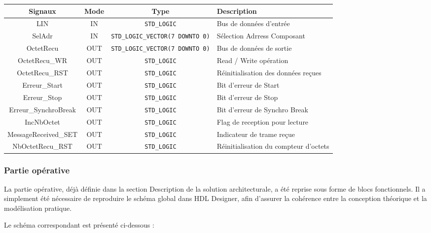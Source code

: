 \begin{center}
\renewcommand{\arraystretch}{1.2} %
\small %
    \begin{tabularx}{\textwidth}{|c||c|c|X|}
     \hline			
       \textbf{Signaux} & \textbf{Mode} & \textbf{Type} & \textbf{Description}  \\ \hline 
       LIN & IN & \texttt{STD\_LOGIC} & Bus de données d'entrée \\
       SelAdr & IN & \texttt{STD\_LOGIC\_VECTOR(7 DOWNTO 0)} & Sélection Adrress Composant \\
       OctetRecu & OUT & \texttt{STD\_LOGIC\_VECTOR(7 DOWNTO 0)} & Bus de données de sortie \\
       OctetRecu\_WR & OUT & \texttt{STD\_LOGIC} & Read / Write opération \\
       OctetRecu\_RST & OUT & \texttt{STD\_LOGIC} & Réinitialisation des données reçues \\
       Erreur\_Start & OUT & \texttt{STD\_LOGIC} & Bit d'erreur de Start \\
       Erreur\_Stop & OUT & \texttt{STD\_LOGIC} & Bit d'erreur de Stop\\
       Erreur\_SynchroBreak & OUT & \texttt{STD\_LOGIC} & Bit d'erreur de Synchro Break\\
       IncNbOctet & OUT & \texttt{STD\_LOGIC} & Flag de reception pour lecture \\
       MessageReceived\_SET & OUT & \texttt{STD\_LOGIC} & Indicateur de trame reçue \\
       NbOctetRecu\_RST & OUT & \texttt{STD\_LOGIC} & Réinitialisation du compteur d'octets \\
     \hline  
    \end{tabularx}
\end{center}

\subsubsection{Partie opérative}

La partie opérative, déjà définie dans la section Description de la solution architecturale, a été reprise sous forme de blocs fonctionnels.
Il a simplement été nécessaire de reproduire le schéma global dans HDL Designer, afin d’assurer la cohérence entre la conception théorique et la modélisation pratique.

Le schéma correspondant est présenté ci-dessous :


